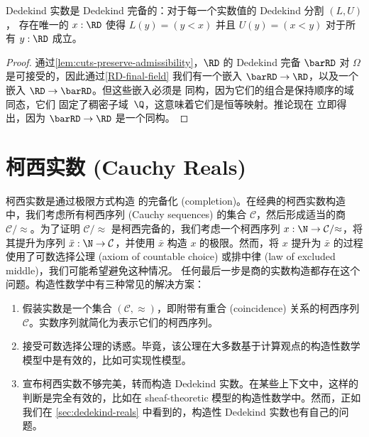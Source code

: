 \begin{cor} \label{RD-dedekind-complete}
%
%
%
Dedekind 实数是 Dedekind 完备的：对于每一个实数值的 Dedekind 分割 $(L, U)$，
存在唯一的 $x : \RD$ 使得 $L(y) = (y < x)$ 并且 $U(y) = (x < y)$ 对于所有 $y :
\RD$ 成立。
\end{cor}

\begin{proof}
  通过\cref{lem:cuts-preserve-admissibility}，$\RD$ 的 Dedekind 完备 $\barRD$
  对 $\Omega$ 是可接受的，因此通过\cref{RD-final-field} 我们有一个嵌入 $\barRD
  \to \RD$，以及一个嵌入 $\RD \to \barRD$。但这些嵌入必须是
  同构，因为它们的组合是保持顺序的域同态，它们
  固定了稠密子域~$\Q$，这意味着它们是恒等映射。推论现在
  立即得出，因为 $\barRD \to \RD$ 是一个同构。
\end{proof}

%

\section{柯西实数 (Cauchy Reals)}
\label{sec:cauchy-reals}

%
%
%
柯西实数是通过极限方式构造 \Q 的完备化 (completion)。在经典的柯西实数构造中，我们考虑所有柯西序列 (Cauchy sequences) 的集合 $\mathcal{C}$，然后形成适当的商 $\mathcal{C}/{\approx}$。为了证明 $\mathcal{C}/{\approx}$ 是柯西完备的，我们考虑一个柯西序列 $x : \N \to \mathcal{C}/{\approx}$，将其提升为序列 $\bar{x} : \N \to \mathcal{C}$，并使用 $\bar{x}$ 构造 $x$ 的极限。然而，将 $x$ 提升为 $\bar{x}$ 的过程使用了可数选择公理 (axiom of countable choice) 或排中律 (law of excluded middle)，我们可能希望避免这种情况。
%
任何最后一步是商的实数构造都存在这个问题。构造性数学中有三种常见的解决方案：
%
\begin{enumerate}
  \item 假装实数是一个集合 $(\mathcal{C}, {\approx})$，即附带有重合 (coincidence) 关系的柯西序列 $\mathcal{C}$。实数序列就简化为表示它们的柯西序列。
  \item 接受可数选择公理的诱惑。毕竟，该公理在大多数基于计算观点的构造性数学模型中是有效的，比如可实现性模型。
  \item 宣布柯西实数不够完美，转而构造 Dedekind 实数。在某些上下文中，这样的判断是完全有效的，比如在 sheaf-theoretic 模型的构造性数学中。然而，正如我们在 \cref{sec:dedekind-reals} 中看到的，构造性 Dedekind 实数也有自己的问题。
\end{enumerate}

